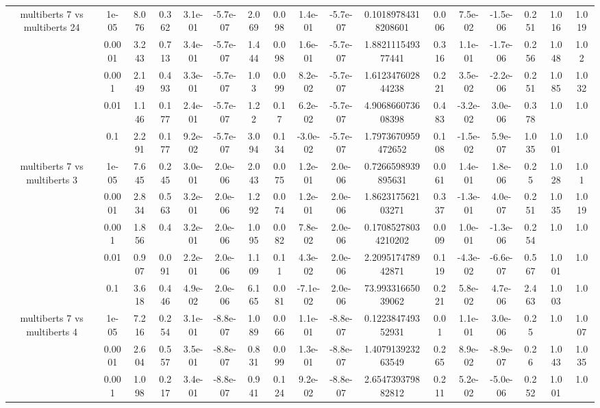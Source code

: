 \begin{tabular}{|c|c|c|c|c|c|c|c|c|c|c|c|c|c|c|c|c|}
\hline
\multirow{5}{*}{multiberts 7 vs multiberts 24} & 1e-05 & 8.076 & 0.362 & 3.1e-01 & -5.7e-07 & 2.069 & 0.098 & 1.4e-01 & -5.7e-07 & 0.10189784318208601 & 0.006 & 7.5e-02 & -1.5e-06 & 0.251 & 1.016 & 1.019 \\
 & 0.0001 & 3.243 & 0.713 & 3.4e-01 & -5.7e-07 & 1.444 & 0.098 & 1.6e-01 & -5.7e-07 & 1.882111549377441 & 0.316 & 1.1e-01 & -1.7e-06 & 0.256 & 1.048 & 1.02 \\
 & 0.001 & 2.149 & 0.493 & 3.3e-01 & -5.7e-07 & 1.03 & 0.099 & 8.2e-02 & -5.7e-07 & 1.612347602844238 & 0.221 & 3.5e-02 & -2.2e-06 & 0.251 & 1.085 & 1.032 \\
 & 0.01 & 1.146 & 0.177 & 2.4e-01 & -5.7e-07 & 1.22 & 0.17 & 6.2e-02 & -5.7e-07 & 4.906866073608398 & 0.483 & -3.2e-02 & 3.0e-06 & 0.378 & 1.0 & 1.0 \\
 & 0.1 & 2.291 & 0.177 & 9.2e-02 & -5.7e-07 & 3.094 & 0.134 & -3.0e-02 & -5.7e-07 & 1.7973670959472652 & 0.108 & -1.5e-02 & 5.9e-07 & 1.035 & 1.001 & 1.0 \\
\hline
\multirow{5}{*}{multiberts 7 vs multiberts 3} & 1e-05 & 7.645 & 0.245 & 3.0e-01 & 2.0e-06 & 2.043 & 0.075 & 1.2e-01 & 2.0e-06 & 0.7266598939895631 & 0.061 & 1.4e-01 & 1.8e-06 & 0.25 & 1.028 & 1.01 \\
 & 0.0001 & 2.834 & 0.563 & 3.2e-01 & 2.0e-06 & 1.292 & 0.074 & 1.2e-01 & 2.0e-06 & 1.862317562103271 & 0.337 & -1.3e-01 & 4.0e-07 & 0.251 & 1.035 & 1.019 \\
 & 0.001 & 1.856 & 0.4 & 3.2e-01 & 2.0e-06 & 1.095 & 0.082 & 7.8e-02 & 2.0e-06 & 0.17085278034210202 & 0.009 & 1.0e-01 & -1.3e-06 & 0.254 & 1.0 & 1.0 \\
 & 0.01 & 0.907 & 0.091 & 2.2e-01 & 2.0e-06 & 1.109 & 0.11 & 4.3e-02 & 2.0e-06 & 2.209517478942871 & 0.119 & -4.3e-02 & -6.6e-07 & 0.567 & 1.001 & 1.0 \\
 & 0.1 & 3.618 & 0.446 & 4.9e-02 & 2.0e-06 & 6.165 & 0.081 & -7.1e-02 & 2.0e-06 & 73.99331665039062 & 0.221 & 5.8e-02 & 4.7e-06 & 2.463 & 1.003 & 1.0 \\
\hline
\multirow{5}{*}{multiberts 7 vs multiberts 4} & 1e-05 & 7.216 & 0.254 & 3.1e-01 & -8.8e-07 & 1.089 & 0.066 & 1.1e-01 & -8.8e-07 & 0.122384749352931 & 0.01 & 1.1e-01 & 3.0e-06 & 0.25 & 1.0 & 1.007 \\
 & 0.0001 & 2.604 & 0.557 & 3.5e-01 & -8.8e-07 & 0.831 & 0.099 & 1.3e-01 & -8.8e-07 & 1.407913923263549 & 0.265 & 8.9e-02 & -8.9e-07 & 0.26 & 1.043 & 1.035 \\
 & 0.001 & 1.098 & 0.217 & 3.4e-01 & -8.8e-07 & 0.941 & 0.124 & 9.2e-02 & -8.8e-07 & 2.654739379882812 & 0.211 & 5.2e-02 & -5.0e-06 & 0.252 & 1.001 & 1.0 \\

\end{tabular}
